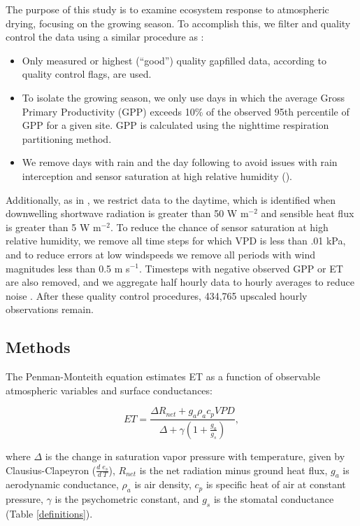 \documentclass[draft,linenumbers]{agujournal}
\begin{document}
The purpose of this study is to examine ecosystem response to atmospheric drying, focusing on the growing season. To accomplish this, we filter and quality control the data using a similar procedure as \cite{Zhou_2015}:
\begin{itemize}
\item Only measured or highest (``good'') quality gapfilled data, according to quality control flags, are used.
\item To isolate the growing season, we only use days in which the average Gross Primary Productivity (GPP) exceeds 10\% of the observed 95th percentile of GPP for a given site. GPP is calculated using the nighttime respiration partitioning method.
\item We remove days with rain and the day following to avoid issues with rain interception and sensor saturation at high relative humidity (\cite{MEDLYN_2011}).
\end{itemize}
Additionally, as in \citet{Lin_2018}, we restrict data to the daytime, which is identified when downwelling shortwave radiation is greater than 50 W m$^{-2}$ and sensible heat flux is greater than 5 W m$^{-2}$. To reduce the chance of sensor saturation at high relative humidity, we remove all time steps for which VPD is less than .01 kPa, and to reduce errors at low windspeeds we remove all periods with wind magnitudes less than 0.5 m s$^{-1}$. Timesteps with negative observed GPP or ET are also removed, and we aggregate half hourly data to hourly averages to reduce noise \citep{Lin_2018}. After these quality control procedures, 434,765 upscaled hourly observations remain. 

\subsection{Methods}
\label{methods}
The Penman-Monteith equation \citep [hereafter PM,][]{Penman_1948, Monteith_1965} estimates ET as a function of observable atmospheric variables and surface conductances:
\begin{linenomath*}
  \begin{equation}
    \label{orig_pen}
    ET = \frac{\Delta R_{net} + g_a \rho_a c_p VPD}{\Delta + \gamma(1 + \frac{g_a}{g_s})},
  \end{equation}
\end{linenomath*}
where $\Delta$ is the change in saturation vapor pressure with temperature, given by Clausius-Clapeyron ($\frac{d \; e_s}{d \; T}$), $R_{net}$ is the net radiation minus ground heat flux, $g_a$ is aerodynamic conductance, $\rho_a$ is air density, $c_p$ is specific heat of air at constant pressure, $\gamma$ is the psychometric constant, and $g_s$ is the stomatal conductance (Table \ref{definitions}).
\end{document}
